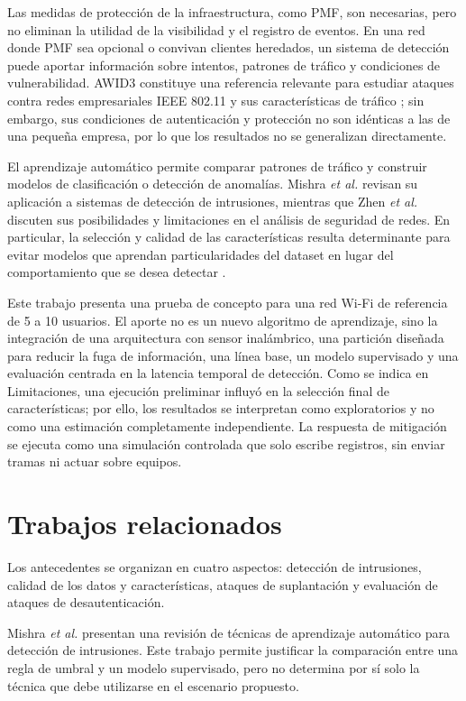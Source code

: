 \documentclass[journal]{IEEEtran}
\begin{document}
Las medidas de protección de la infraestructura, como PMF, son necesarias, pero no eliminan la utilidad de la visibilidad y el registro de eventos. En una red donde PMF sea opcional o convivan clientes heredados, un sistema de detección puede aportar información sobre intentos, patrones de tráfico y condiciones de vulnerabilidad. AWID3 constituye una referencia relevante para estudiar ataques contra redes empresariales IEEE 802.11 y sus características de tráfico \cite{chatzoglou2021}; sin embargo, sus condiciones de autenticación y protección no son idénticas a las de una pequeña empresa, por lo que los resultados no se generalizan directamente.

El aprendizaje automático permite comparar patrones de tráfico y construir modelos de clasificación o detección de anomalías. Mishra \textit{et al.} \cite{mishra2019} revisan su aplicación a sistemas de detección de intrusiones, mientras que Zhen \textit{et al.} \cite{zhen2025} discuten sus posibilidades y limitaciones en el análisis de seguridad de redes. En particular, la selección y calidad de las características resulta determinante para evitar modelos que aprendan particularidades del dataset en lugar del comportamiento que se desea detectar \cite{pick2022}.

Este trabajo presenta una prueba de concepto para una red Wi-Fi de referencia de 5 a 10 usuarios. El aporte no es un nuevo algoritmo de aprendizaje, sino la integración de una arquitectura con sensor inalámbrico, una partición diseñada para reducir la fuga de información, una línea base, un modelo supervisado y una evaluación centrada en la latencia temporal de detección. Como se indica en Limitaciones, una ejecución preliminar influyó en la selección final de características; por ello, los resultados se interpretan como exploratorios y no como una estimación completamente independiente. La respuesta de mitigación se ejecuta como una simulación controlada que solo escribe registros, sin enviar tramas ni actuar sobre equipos.

\section{Trabajos relacionados}

Los antecedentes se organizan en cuatro aspectos: detección de intrusiones, calidad de los datos y características, ataques de suplantación y evaluación de ataques de desautenticación.

Mishra \textit{et al.} \cite{mishra2019} presentan una revisión de técnicas de aprendizaje automático para detección de intrusiones. Este trabajo permite justificar la comparación entre una regla de umbral y un modelo supervisado, pero no determina por sí solo la técnica que debe utilizarse en el escenario propuesto.
\end{document}

